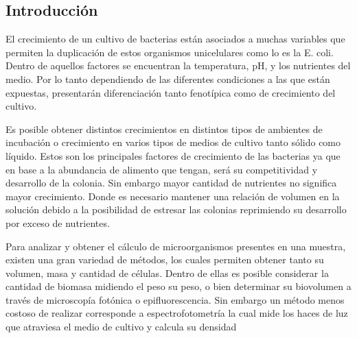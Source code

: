 \subsection{Introducción}

El crecimiento de un cultivo de bacterias están asociados a muchas variables que permiten la duplicación de estos organismos unicelulares como lo es la E. coli. Dentro de aquellos factores se encuentran la temperatura, pH, y los nutrientes del medio. Por lo tanto dependiendo de las diferentes condiciones a las que están expuestas, presentarán diferenciación tanto fenotípica como de crecimiento del cultivo. 

Es posible obtener distintos crecimientos en distintos tipos de ambientes de incubación o crecimiento en varios tipos de medios de cultivo tanto sólido como líquido. Estos son los principales factores de crecimiento de las bacterias ya que en base a la abundancia de alimento que tengan, será su competitividad y desarrollo de la colonia. Sin embargo mayor cantidad de nutrientes no significa mayor crecimiento. Donde es necesario mantener una relación de volumen en la solución debido a la posibilidad de estresar las colonias reprimiendo su desarrollo por exceso de nutrientes. 

Para analizar y obtener el cálculo de microorganismos presentes en una muestra, existen una gran variedad de métodos, los cuales permiten obtener tanto su volumen, masa y cantidad de células. Dentro de ellas es posible considerar la cantidad de biomasa midiendo el peso su peso, o bien determinar su biovolumen a través de microscopía fotónica o epifluorescencia. Sin embargo un método menos costoso de realizar corresponde a espectrofotometría la cual mide los haces de luz que atraviesa el medio de cultivo y calcula su densidad
